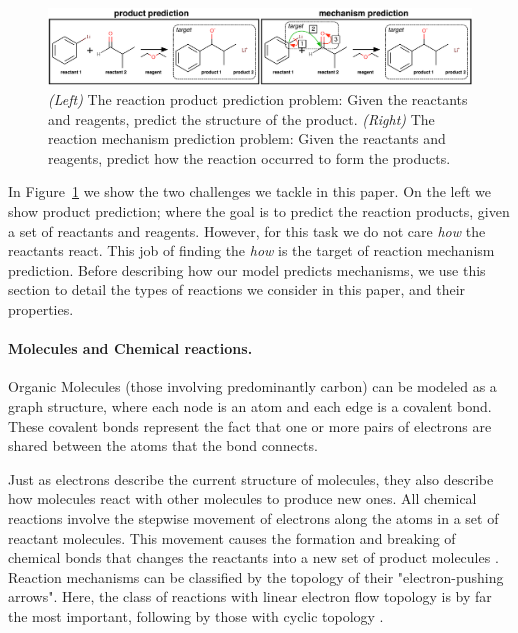 

\begin{figure}[t!]
\centering
\includegraphics[width=\textwidth]{reaction_diagram}
\caption{\emph{(Left)} The reaction product prediction problem: Given the reactants and reagents, predict the structure of the product. \emph{(Right)} The reaction mechanism prediction problem: Given the reactants and reagents, predict how the reaction occurred to form the products.}
\label{fig:task-overview}
\end{figure}


In Figure~\ref{fig:task-overview} we show the two challenges we tackle in this paper. 
On the left we show product prediction; where the goal is to predict the reaction products, given a set of reactants and reagents. However, for this task we do not care {\em how} the reactants react.
 This job of finding the {\em how} is the target of reaction mechanism prediction. 
 Before describing how our model predicts mechanisms, we use this section to detail the types of reactions we consider in this paper, and their properties.



\vspace{-0.15cm}
\paragraph{Molecules and Chemical reactions.}


Organic Molecules (those involving predominantly carbon) can be modeled as a graph structure, where each node is an atom and each edge is a covalent bond.
These covalent bonds represent the fact that 
one or more pairs of electrons are shared between the atoms that the bond connects. 


Just as electrons describe the current structure of molecules, 
they also describe how molecules react with other molecules to produce new ones. All chemical reactions involve the stepwise movement of electrons along the atoms in a set of reactant molecules. 
This movement causes the formation and breaking of chemical bonds that changes the reactants into a new set of product molecules \cite{herges1994coarctate}. 
Reaction mechanisms can be classified by the topology of their "electron-pushing arrows". Here, the class of reactions with linear electron flow topology is by far the most important, following by those with cyclic topology \citep{herges1994coarctate}.

